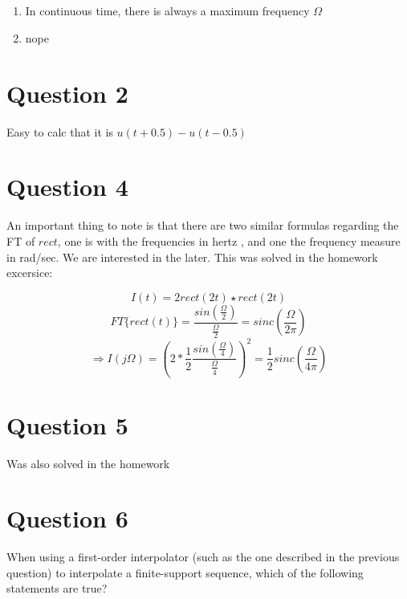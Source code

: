 \documentclass[a4paper]{article}
\begin{document}
\subsection{}
\begin{enumerate}
\item In continuous time, there is always a maximum frequency $\Omega$
\item nope
\end{enumerate}

\section{Question 2}
Easy to calc that it is $u(t+0.5) - u(t-0.5)$

\section{Question 4}
An important thing to note is that there are two similar formulas regarding the FT
of $rect$, one is with the frequencies in hertz , and one the frequency measure in rad/sec.
We are interested in the later.
This was solved in the homework excersice:

$$I(t) = 2rect(2t)\star rect(2t)$$
$$FT\{rect(t)\} = \frac{sin(\frac{\Omega}{2})}{\frac{\Omega}{2}} = sinc(\frac{\Omega}{2\pi})$$
$$ \Rightarrow I(j\Omega) = (2 * \frac{1}{2} \frac{sin(\frac{\Omega}{4})}{\frac{\Omega}{4}})^2 = \frac{1}{2}sinc(\frac{\Omega}{4\pi}) $$

\section{Question 5}
Was also solved in the homework

\section{Question 6}
When using a first-order interpolator (such as the one described in the previous question) to interpolate a finite-support sequence, which of the following statements are true?
\end{document}
